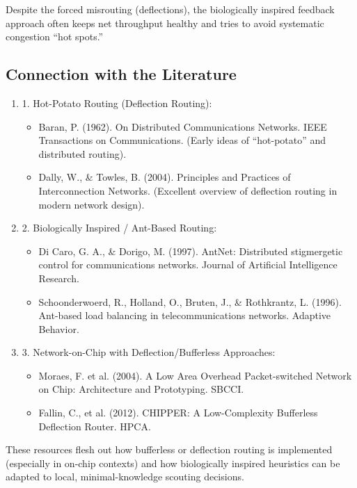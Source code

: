 \documentclass[../OAE-SPEC-MAIN.tex]{subfiles}
\begin{document}
Despite the forced misrouting (deflections), the biologically inspired feedback approach often keeps net throughput healthy and tries to avoid systematic congestion ``hot spots.''

\subsection{Connection with the Literature}%

\begin{enumerate}
\item 	1.	Hot-Potato Routing (Deflection Routing):
	\begin{itemize}
	\item Baran, P. (1962). On Distributed Communications Networks. IEEE Transactions on Communications. (Early ideas of “hot-potato” and distributed routing).
	\item Dally, W., \& Towles, B. (2004). Principles and Practices of Interconnection Networks. (Excellent overview of deflection routing in modern network design).
 	\end{itemize}

\item 	2.	Biologically Inspired / Ant-Based Routing:
	\begin{itemize}
	\item Di Caro, G. A., \& Dorigo, M. (1997). AntNet: Distributed stigmergetic control for communications networks. Journal of Artificial Intelligence Research.
	\item Schoonderwoerd, R., Holland, O., Bruten, J., \& Rothkrantz, L. (1996). Ant-based load balancing in telecommunications networks. Adaptive Behavior.
	\end{itemize}
\item	3.	Network-on-Chip with Deflection/Bufferless Approaches:
	\begin{itemize}
	\item Moraes, F. et al. (2004). A Low Area Overhead Packet-switched Network on Chip: Architecture and Prototyping. SBCCI.
	\item Fallin, C., et al. (2012). CHIPPER: A Low-Complexity Bufferless Deflection Router. HPCA.
	\end{itemize}
\end{enumerate}

These resources flesh out how bufferless or deflection routing is implemented (especially in on-chip contexts) and how biologically inspired heuristics can be adapted to local, minimal-knowledge scouting decisions.
\end{document}

